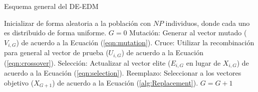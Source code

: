 \begin{algorithm}[t]
  \scriptsize
	\caption{Esquema general del DE-EDM} 
	\begin{algorithmic}[1]
	\STATE Inicializar de forma aleatoria a la población con $NP$ individuos, donde cada uno es distribuido de forma uniforme.
	\STATE $G=0$
		\STATE Mutación: Generar al vector mutado ($V_{i,G}$) de acuerdo a la Ecuación (\ref{eqn:mutation}).
		\STATE Cruce: Utilizar la recombinación para general al vector de prueba ($U_{i,G}$) de acuerdo a la Ecuación (\ref{eqn:crossover}).
		\STATE Selección: Actualizar al vector elite ($E_{i,G}$ en lugar de $X_{i,G}$) de acuerdo a la Ecuación (\ref{eqn:selection}).
	   \ENDFOR
		\STATE Reemplazo: Seleccionar a los vectores objetivo ($X_{G+1}$) de acuerdo a la Ecuación (\ref{alg:Replacement}).
	   \STATE $G=G+1$
	\ENDWHILE
\end{algorithmic}
    \label{alg:DEEDM}
\end{algorithm}


